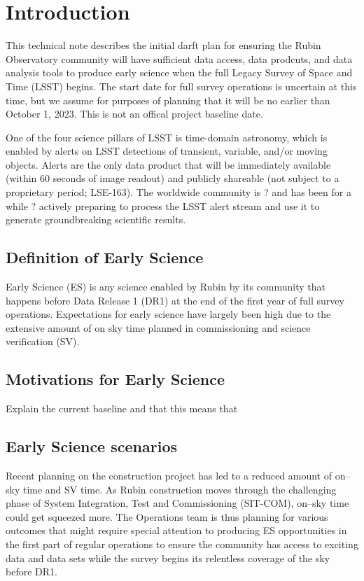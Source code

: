 \section{Introduction}
This technical note describes the initial darft plan for ensuring the Rubin Observatory community will have sufficient data access, data prodcuts, and data analysis tools to produce early science when the full Legacy Survey of Space and Time (LSST)  begins. The start date for full survey operations is uncertain at this time, but we assume for purposes of planning that it will be no earlier than October 1, 2023. This is not an offical project baseline date.


One of the four science pillars of LSST is time-domain astronomy, which is enabled by alerts
on LSST detections of transient, variable, and/or moving objects. Alerts are the only data
product that will be immediately available (within 60 seconds of image readout) and publicly
shareable (not subject to a proprietary period; LSE-163). The worldwide community is ? and
has been for a while ? actively preparing to process the LSST alert stream and use it to generate groundbreaking scientific results.


\subsection{Definition of Early Science}

Early Science (ES) is any science enabled by Rubin by its community that happens before Data Release 1 (DR1) at the end of the first year of full survey operations. Expectations for early science have largely been high due to the extensive amount of on sky time planned in commissioning and science verification (SV).  


\subsection{Motivations for Early Science}
Explain the current baseline and that this means that 

\subsection{Early Science scenarios }

Recent planning on the construction project has led to a reduced amount of on--sky time and SV time.
As Rubin construction moves through the challenging phase of System Integration, Test and Commissioning (SIT-COM), on--sky time could get squeezed more. The Operations team is thus planning for various outcomes that might require special attention to producing ES opportunities in the first part of regular operations to ensure the community has access to exciting data and data sets while the survey begins its relentless coverage of the sky before DR1.

